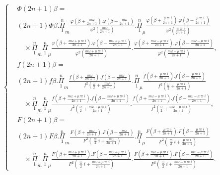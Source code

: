 \documentclass{article}
\begin{document}
\[ \left\{\begin{aligned}
&\Phi(2n+1)\beta=\\
&(2n+1)\Phi\beta.\overset{n}{\underset{1}{\Pi}}_{m}\frac{\varphi\left(\beta+\frac{m\omega}{2n+1}\right).\varphi\left(\beta-\frac{m\omega}{2n+1}\right)}{\varphi^{2}\left(\frac{m\omega}{2n+1}\right)}.\overset{n}{\underset{1}{\Pi}}_{\mu}\frac{\varphi\left(\beta+\frac{\mu\varpi i}{2n+1}\right).\varphi\left(\beta-\frac{\mu\varpi i}{2n+1}\right)}{\varphi^{2}\left(\frac{\mu\varpi i}{2n+1}\right)}\\
&\quad\times\overset{n}{\underset{1}{\Pi}}_{m}\overset{n}{\underset{1}{\Pi}}_{\mu}\frac{\varphi\left(\beta+\frac{m\omega+\mu\varpi i}{2n+1}\right).\varphi\left(\beta-\frac{m\omega+\mu\varpi i}{2n+1}\right)}{\varphi^{2}\left(\frac{m\omega+\mu\varpi i}{2n+1}\right)}.\frac{\varphi\left(\beta+\frac{m\omega-\mu\varpi i}{2n+1}\right).\varphi\left(\beta-\frac{m\omega-\mu\varpi i}{2n+1}\right)}{\varphi^{2}\left(\frac{m\omega-\mu\varpi i}{2n+1}\right)},\\
&f(2n+1)\beta=\\
&(2n+1)f\beta.\overset{n}{\underset{1}{\Pi}}_{m}\frac{f\left(\beta+\frac{m\omega}{2n+1}\right).f\left(\beta-\frac{m\omega}{2n+1}\right)}{f^{2}\left(\frac{\omega}{2}+\frac{m\omega}{2n+1}\right)}.\overset{n}{\underset{1}{\Pi}}_{\mu}\frac{f\left(\beta+\frac{\mu\varpi i}{2n+1}\right).f\left(\beta-\frac{\mu\varpi i}{2n+1}\right)}{f^{2}\left(\frac{\omega}{2}+\frac{\mu\varpi i}{2n+1}\right)}\\
&\quad\times\overset{n}{\underset{1}{\Pi}}_{m}\overset{n}{\underset{1}{\Pi}}_{\mu}\frac{f\left(\beta+\frac{m\omega+\mu\varpi i}{2n+1}\right).f\left(\beta-\frac{m\omega+\mu\varpi i}{2n+1}\right)}{f^{2}\left(\frac{\omega}{2}+\frac{m\omega+\mu\varpi i}{2n+1}\right)}.\frac{f\left(\beta+\frac{m\omega-\mu\varpi i}{2n+1}\right).f\left(\beta-\frac{m\omega-\mu\varpi i}{2n+1}\right)}{f^{2}\left(\frac{\omega}{2}+\frac{m\omega-\mu\varpi i}{2n+1}\right)},\\
&F(2n+1)\beta=\\
&(2n+1)F\beta.\overset{n}{\underset{1}{\Pi}}_{m}\frac{F\left(\beta+\frac{m\omega}{2n+1}\right).F\left(\beta-\frac{m\omega}{2n+1}\right)}{F^{2}\left(\frac{\varpi}{2}i+\frac{m\omega}{2n+1}\right)}.\overset{n}{\underset{1}{\Pi}}_{\mu}\frac{F\left(\beta+\frac{\mu\varpi i}{2n+1}\right).F\left(\beta-\frac{\mu\varpi i}{2n+1}\right)}{F^{2}\left(\frac{\varpi}{2}i+\frac{\mu\varpi i}{2n+1}\right)}\\
&\quad\times\overset{n}{\underset{1}{\Pi}}_{m}\overset{n}{\underset{1}{\Pi}}_{\mu}\frac{F\left(\beta+\frac{m\omega+\mu\varpi i}{2n+1}\right).F\left(\beta-\frac{m\omega+\mu\varpi i}{2n+1}\right)}{F^{2}\left(\frac{\varpi}{2}i+\frac{m\omega+\mu\varpi i}{2n+1}\right)}.\frac{F\left(\beta+\frac{m\omega-\mu\varpi i}{2n+1}\right).F\left(\beta-\frac{m\omega-\mu\varpi i}{2n+1}\right)}{F^{2}\left(\frac{\varpi}{2}i+\frac{m\omega-\mu\varpi i}{2n+1}\right)}.
\end{aligned}\right. \tag{129.} \]
\end{document}
